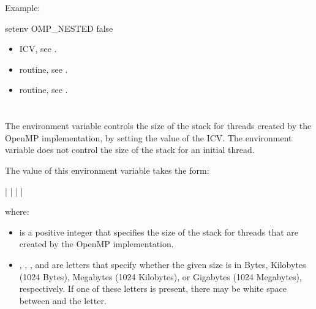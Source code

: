 Example:
\begin{ompEnv}
setenv OMP_NESTED false
\end{ompEnv}

\crossreferences
\begin{itemize}
\item {} ICV, see .

\item {} routine, see .

\item {} routine, see .
\end{itemize}











\section{}
\label{sec:OMP_STACKSIZE}
The  environment variable controls the size of the stack for threads
created by the OpenMP implementation, by setting the value of the  ICV.
The environment variable does not control the size of the stack for an initial thread.

The value of this environment variable takes the form:

 |  |  |  | 

where:

\begin{itemize}
\item {} is a positive integer that specifies the size of the stack for threads that are created
by the OpenMP implementation.

\item {}, , , and  are letters that specify
whether the given size is in Bytes, Kilobytes
(1024 Bytes), Megabytes (1024 Kilobytes), or Gigabytes (1024 Megabytes),
respectively. If one of these letters is present, there may be white space between
 and the letter.
\end{itemize}

